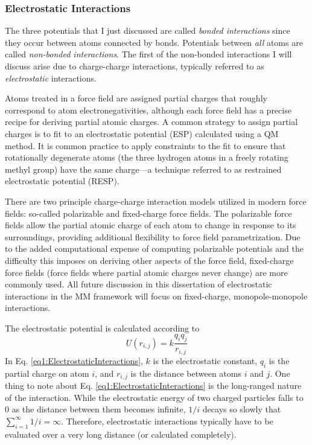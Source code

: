 \subsubsection{Electrostatic Interactions}
\label{sec1:MMEEL}

The three potentials that I just discussed are called \emph{bonded
interactions} since they occur between atoms connected by bonds. Potentials
between \emph{all} atoms are called \emph{non-bonded interactions}. The first of
the non-bonded interactions I will discuss arise due to charge-charge
interactions, typically referred to as \emph{electrostatic} interactions.

Atoms treated in a force field are assigned partial charges that roughly
correspond to atom electronegativities, although each force field has a precise
recipe for deriving partial atomic charges. A common strategy to assign partial
charges is to fit to an electrostatic potential (ESP) calculated using a QM
method. It is common practice to apply constraints to the fit to ensure that
rotationally degenerate atoms (\eg the three hydrogen atoms in a freely rotating
methyl group) have the same charge---a technique referred to as restrained
electrostatic potential (RESP). \cite{Bayly_JPhysChem_1993_v97_p10269,
Cornell_JAmChemSoc_1993_v115_p9620, Cieplak_JComputChem_1995_v16_p1357}

There are two principle charge-charge interaction models utilized in modern
force fields: so-called polarizable and fixed-charge force fields. The
polarizable force fields allow the partial atomic charge of each atom to change
in response to its surroundings, providing additional flexibility to force field
parametrization. Due to the added computational expense of computing polarizable
potentials and the difficulty this imposes on deriving other aspects of the
force field, fixed-charge force fields (\ie force fields where partial atomic
charges never change) are more commonly used. All future discussion in this
dissertation of electrostatic interactions in the MM framework will focus on
fixed-charge, monopole-monopole interactions.

The electrostatic potential is calculated according to
\begin{equation}
   U (r_{i,j}) = k \frac {q_i q_j} {r_{i,j}}
   \label{eq1:ElectrostaticInteractions}
\end{equation}
In Eq. \ref{eq1:ElectrostaticInteractions}, $k$ is the electrostatic constant,
$q_i$ is the partial charge on atom $i$, and $r_{i,j}$ is the distance between
atoms $i$ and $j$. One thing to note about Eq.
\ref{eq1:ElectrostaticInteractions} is the long-ranged nature of the
interaction. While the electrostatic energy of two charged particles falls to 0
as the distance between them becomes infinite, $1 / i$ decays so slowly that
$\sum _ {i=1}^{\infty} 1 / i = \infty$. Therefore, electrostatic interactions
typically have to be evaluated over a very long distance (or calculated
completely).

